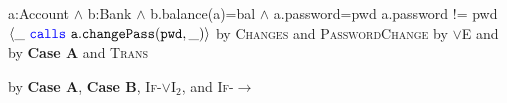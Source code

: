 \begin{proofexample}
{\begin{proofexample}
{{					{a:Account $\wedge$ b:Bank $\wedge$ b.balance(a)=bal $\wedge$ a.password=pwd}
					{a.password != pwd}
					{$\langle \_\ {\color{blue}\texttt{calls}}\ {\texttt{a}}.{\texttt{changePass}}({\texttt{pwd}}, \_) \rangle$}
					}
				{by \textsc{Changes} and \textsc{PasswordChange}}}
		{
				{by $\vee$E and }}
		{
				{by \textbf{Case A} and \textsc{Trans}}}
	\endproofsteps
	\end{proofexample}
	}
	{
			{by \textbf{Case A}, \textbf{Case B}, \textsc{If-}$\vee$I$_2$, and \textsc{If-}$\longrightarrow$}}
\endproofsteps
\end{proofexample}
